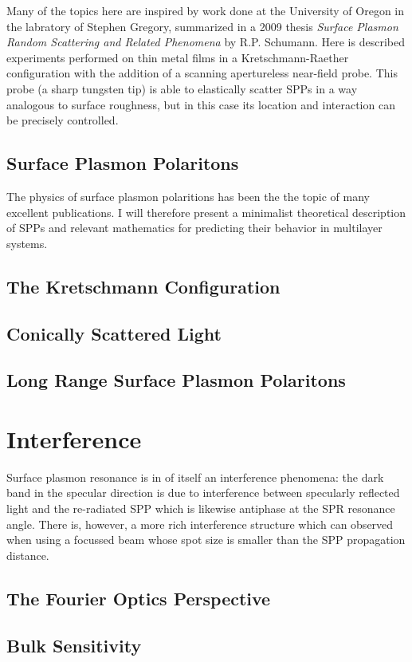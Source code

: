 \documentclass[a4paper,titlepage,onecolumn]{report}
\begin{document}
Many of the topics here are inspired by work done at the University of
Oregon in the labratory of Stephen Gregory, summarized in a 2009 thesis
{\it Surface Plasmon Random Scattering and Related Phenomena}
\cite{schumann2009surface} by R.P. Schumann.  Here is described experiments
performed on thin metal films in a Kretschmann-Raether configuration with
the addition of a scanning apertureless near-field probe.  This probe (a
sharp tungsten tip) is able to elastically scatter SPPs in a way analogous
to surface roughness, but in this case its location and interaction can be
precisely controlled.  

\section{Surface Plasmon Polaritons}
The physics of surface plasmon polaritions has been the the topic of many
excellent publications. I will therefore present a minimalist theoretical
description of SPPs and relevant mathematics for predicting their behavior
in multilayer systems.
\section{The Kretschmann Configuration}
\section{Conically Scattered Light}
\section{Long Range Surface Plasmon Polaritons}


\chapter{Interference}
Surface plasmon resonance is in of itself an interference phenomena: the
dark band in the specular direction is due to interference between
specularly reflected light and the re-radiated SPP which is likewise
antiphase at the SPR resonance angle.  There is, however, a more rich 
interference structure which can observed when using a focussed beam whose
spot size is smaller than the SPP propagation distance.  

\section{The Fourier Optics Perspective}
\section{Bulk Sensitivity}
\end{document}
